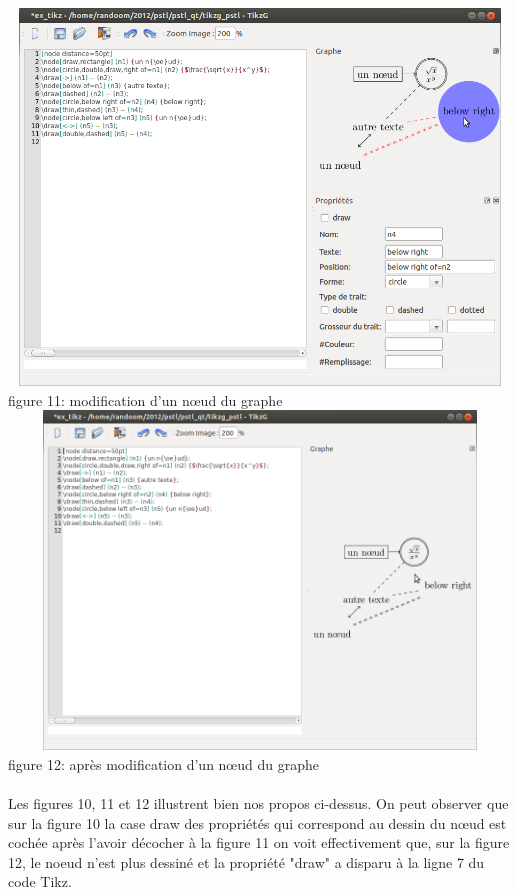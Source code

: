 \documentclass[a4paper]{report}
\begin{document}
  \includegraphics[width=15cm, height=10cm]{img/r_12.png}
\\ 
figure 11: modification d'un n{\oe}ud du graphe
\\
  \includegraphics[width=15cm, height=9cm]{img/r_13.png}
\\ 
figure 12: après modification d'un n{\oe}ud du graphe
\\ \\
Les figures 10, 11 et 12 illustrent bien nos propos ci-dessus. On peut observer que sur la figure 10 la case draw des propriétés qui correspond au dessin du n{\oe}ud est cochée après l'avoir décocher à la figure 11 on voit effectivement que, sur la figure  12, le noeud n'est plus dessiné et la propriété "draw" a disparu à la ligne 7 du code Tikz.
\\ \\ \\ \\ \\
\end{document}
